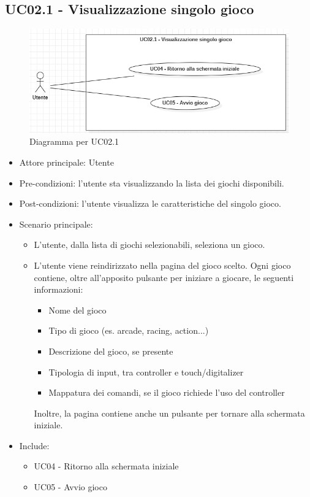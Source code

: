 \subsection{UC02.1 - Visualizzazione singolo gioco}
\begin{figure}[h]
    \centering
    \includegraphics[width=400pt]{images/usecase/UC02_1.png}
    \caption{Diagramma per UC02.1}
    \label{fig:UC02.1}
\end{figure}
\begin{itemize}
    \item Attore principale: Utente
    \item Pre-condizioni: l'utente sta visualizzando la lista dei giochi disponibili.
    \item Post-condizioni: l'utente visualizza le caratteristiche del singolo gioco.
    \item Scenario principale: \begin{itemize}
        \item L'utente, dalla lista di giochi selezionabili, seleziona un gioco.
        \item L'utente viene reindirizzato nella pagina del gioco scelto. Ogni gioco contiene, oltre all'apposito pulsante per iniziare a giocare, le seguenti informazioni: \begin{itemize}
            \item Nome del gioco
            \item Tipo di gioco (es. arcade, racing, action...)
            \item Descrizione del gioco, se presente
            \item Tipologia di input, tra controller e touch/digitalizer
            \item Mappatura dei comandi, se il gioco richiede l'uso del controller
        \end{itemize} Inoltre, la pagina contiene anche un pulsante per tornare alla schermata iniziale.
    \end{itemize}
    \item Include: \begin{itemize}
        \item UC04 - Ritorno alla schermata iniziale
        \item UC05 - Avvio gioco
    \end{itemize}
\end{itemize}
\newpage
